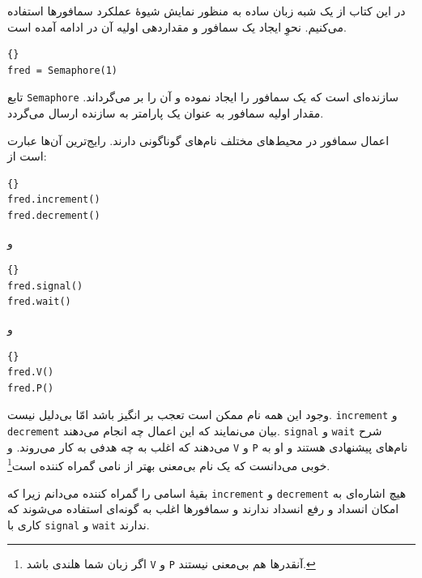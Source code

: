 \documentclass{book}
\begin{document}
    در این کتاب از یک شبه زبان ساده به منظور نمایش شیوهٔ عملکرد سمافورها استفاده می‌کنیم. 
    نحوِ ایجاد یک سمافور و مقداردهی اولیه آن در ادامه آمده است.
%
\begin{latin}
\begin{lstlisting}[title=\rl{نحوِ مقداردهی اولیه سمافور}]{}
fred = Semaphore(1)
\end{lstlisting}
\end{latin}
%
    تابع \texttt{Semaphore} سازنده‌ای است که یک سمافور را ایجاد نموده 
    و آن را بر می‌گرداند. مقدار اولیه سمافور به عنوان یک پارامتر به سازنده ارسال می‌گردد. 

    اعمال سمافور در محیط‌های مختلف نام‌های گوناگونی دارند. رایج‌ترین آن‌ها عبارت است از:
%
\begin{latin}
\begin{lstlisting}[title=\rl{اعمال سمافور}]{}
fred.increment()
fred.decrement()	
\end{lstlisting}
\end{latin}
%
و
%
\begin{latin}
\begin{lstlisting}[title=\rl{اعمال سمافور}]{}
fred.signal()
fred.wait()	
\end{lstlisting}
\end{latin}
%
و
%
\begin{latin}
\begin{lstlisting}[title=\rl{اعمال سمافور}]{}
fred.V()
fred.P()	
\end{lstlisting}
\end{latin}
%
    وجود این همه نام ممکن است تعجب بر انگیز باشد امّا بی‌دلیل نیست. 
    \texttt{increment} و \texttt{decrement}
    بیان می‌نمایند که این اعمال چه انجام می‌دهند. 
    \texttt{signal} و \texttt{wait}
    شرح می‌دهند که اغلب به چه هدفی به کار می‌روند. و
    \texttt{V} و \texttt{P}
    نام‌های پیشنهادی  هستند و او به خوبی می‌دانست که یک نام بی‌معنی بهتر از نامی گمراه کننده است\footnote{%
    اگر زبان شما هلندی باشد \texttt{V} و \texttt{P} آنقدرها هم بی‌معنی نیستند.}. 

    بقیه‌ٔ اسامی را گمراه کننده می‌دانم زیرا که  \texttt{increment} و \texttt{decrement}
    هیچ اشاره‌ای به امکان انسداد و رفع انسداد ندارند و سمافورها اغلب به گونه‌ای استفاده می‌شوند که کاری با \texttt{signal} و \texttt{wait}
    ندارند. 
    
\end{document}
